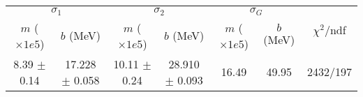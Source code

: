 \begin{tabular}{cc|cc|cc||c}
\multicolumn{2}{c|}{$\sigma_1$} & \multicolumn{2}{|c}{$\sigma_2$} & \multicolumn{2}{|c}{$\sigma_G$}  & \multirow{2}{*}{$\chi^2/$ndf}\\
$m$ ($\times1e5$) & $b$ (MeV) & $m$ ($\times1e5$) & $b$ (MeV) & $m$ ($\times1e5$) & $b$ (MeV) & \\
\hline
8.39 $\pm$ 0.14 & 17.228 $\pm$ 0.058 & 10.11 $\pm$ 0.24 & 28.910 $\pm$ 0.093 & 16.49 & 49.95 & 2432/197\\
\end{tabular}
